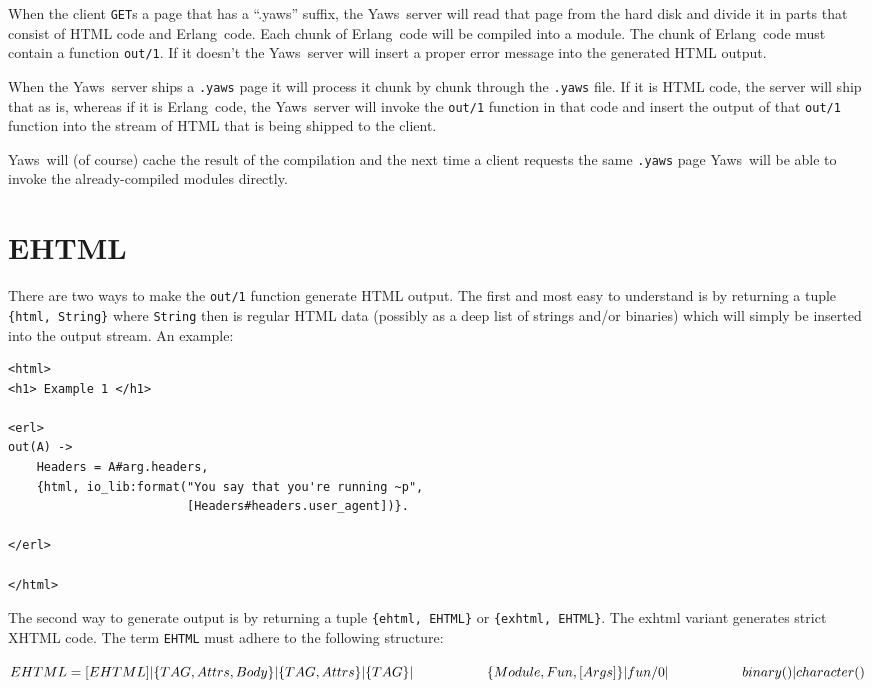 \documentclass[11pt,oneside,english]{book}
\newcommand{\Erlang}            %
        {{\sc Erlang}}
\newcommand{\Yaws}            %
        {{\sc Yaws}}
\begin{document}
When the client \verb+GET+s a page that has a ``.yaws'' suffix, the
\Yaws\ server will read that page from the hard disk and divide it in
parts that consist of HTML code and \Erlang\ code. Each chunk of
\Erlang\ code will be compiled into a module. The chunk of
\Erlang\ code must contain a function \verb+out/1+. If it doesn't the
\Yaws\ server will insert a proper error message into the generated
HTML output.

When the \Yaws\ server ships a \verb+.yaws+ page it will process it
chunk by chunk through the \verb+.yaws+ file. If it is HTML code, the
server will ship that as is, whereas if it is \Erlang\ code, the
\Yaws\ server will invoke the \verb+out/1+ function in that code and
insert the output of that \verb+out/1+ function into the stream of
HTML that is being shipped to the client.

\Yaws\ will (of course) cache the result of the compilation and the
next time a client requests the same \verb+.yaws+ page \Yaws\ will be
able to invoke the already-compiled modules directly.


\section{EHTML}

There are two ways to make the \verb+out/1+ function generate HTML
output. The first and most easy to understand is by returning a tuple
\verb+{html, String}+ where \verb+String+ then is regular HTML data
(possibly as a deep list of strings and/or binaries) which will simply
be inserted into the output stream.
An example:

\begin{verbatim}
<html>
<h1> Example 1 </h1>

<erl>
out(A) ->
    Headers = A#arg.headers,
    {html, io_lib:format("You say that you're running ~p",
                         [Headers#headers.user_agent])}.

</erl>

</html>

\end{verbatim}


The second way to generate output is by returning a tuple
\verb+{ehtml, EHTML}+ or \verb+{exhtml, EHTML}+. The exhtml variant
generates strict XHTML code. The term \verb+EHTML+ must adhere to the
following structure:

$EHTML = [EHTML] | \{TAG, Attrs, Body\} |
               \{TAG, Attrs\} | \{TAG\} |\\*
\hspace*{0.75 in} \{Module, Fun, [Args]\} | fun/0 |\\*
\hspace*{0.75 in} binary() | character()$
\end{document}
